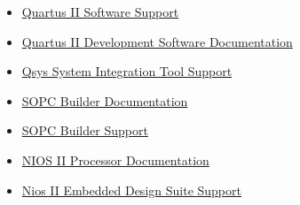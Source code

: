 \documentclass[10pt,twoside]{article}
\begin{document}
\begin{itemize}
%
\item \href{http://www.altera.com/support/software/sof-quartus.html}
{Quartus II Software Support}
%
\item \href{http://www.altera.com/literature/lit-qts.jsp}
{Quartus II Development Software Documentation}
%
\item \href{http://www.altera.com/support/software/system/qsys/sof-qsys-index.html}
{Qsys System Integration Tool Support}
%
\item \href{http://www.altera.com/literature/lit-sop.jsp}{SOPC Builder Documentation}
%
\item \href{http://www.altera.com/support/software/system/sopc/sof-sopc_builder.html}{SOPC Builder Support}
%
\item \href{http://www.altera.com/literature/lit-nio2.jsp}
{NIOS II Processor Documentation}
%
\item \href{http://www.altera.com/support/ip/processors/nios2/ips-nios2_support.html}
{Nios II Embedded Design Suite Support}
%
\end{itemize}

%



\end{document}
